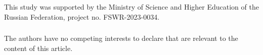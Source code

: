 \documentclass[runningheads]{llncs}
\begin{document}


\begin{credits}
	\subsubsection{\ackname} This study was supported by the Ministry of Science and Higher Education of the Russian Federation, project no. FSWR-2023-0034.
	
	\subsubsection{\discintname}
	The authors have no competing interests to declare that are	relevant to the content of this article.
\end{credits}



%
%

{}
\end{document}
